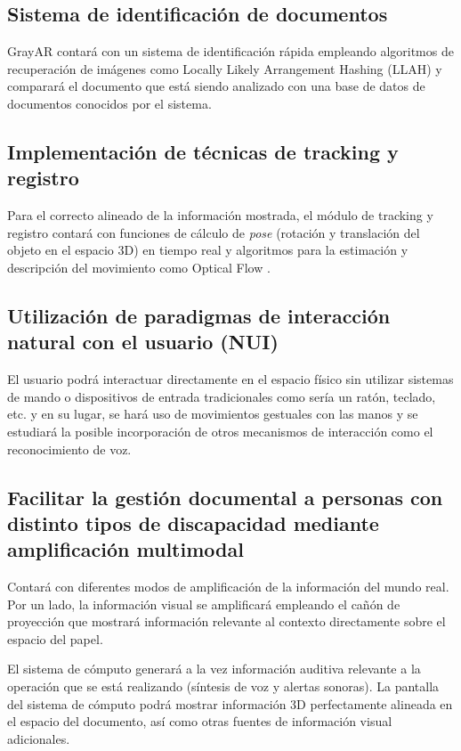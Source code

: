 \subsection{Sistema de identificación de documentos}
GrayAR contará con un sistema de identificación rápida empleando algoritmos de recuperación de imágenes como Locally Likely Arrangement Hashing (LLAH) \cite{Nakai} y comparará el documento que está siendo analizado con una base de datos de documentos conocidos por el sistema.

\subsection{Implementación de técnicas de tracking y registro}
Para el correcto alineado de la información mostrada, el módulo de tracking y registro contará con funciones de cálculo de \emph{pose} (rotación y translación del objeto en el espacio 3D) en tiempo real y algoritmos para la estimación y descripción del movimiento como Optical Flow \cite{LucasKanade}.   

\subsection{Utilización de paradigmas de interacción natural con el usuario  (NUI)}
El usuario podrá interactuar directamente en el espacio físico sin utilizar sistemas de mando o dispositivos de entrada tradicionales como sería un ratón,
teclado, etc. y en su lugar, se hará uso de movimientos gestuales con las manos y se estudiará la posible incorporación de otros mecanismos de interacción como el reconocimiento de voz.

\subsection{Facilitar la gestión documental a personas con distinto tipos de  discapacidad mediante amplificación multimodal} 
Contará con diferentes modos de amplificación de la información del mundo real. Por un lado, la información visual se amplificará empleando el cañón de proyección que mostrará información relevante al contexto directamente sobre el espacio del papel. 

El sistema de cómputo generará a la vez información auditiva relevante a la operación que se está realizando (síntesis de voz y alertas sonoras). La pantalla del sistema de cómputo podrá mostrar información 3D perfectamente alineada en el espacio del documento, así como otras fuentes de información visual adicionales.

